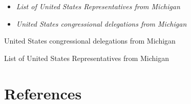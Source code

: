 \begin{itemize}
\item
  \emph{List of United States Representatives from Michigan}
\item
  \emph{United States congressional delegations from Michigan}
\end{itemize}

United States congressional delegations from Michigan

List of United States Representatives from Michigan

\section{References}\label{references}
